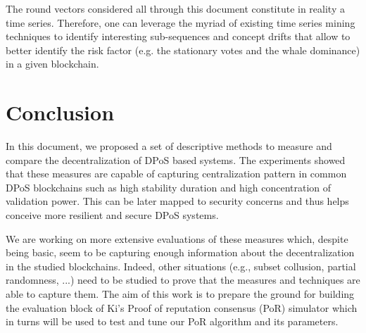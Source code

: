 \documentclass{article}
\begin{document}
The round vectors considered all through this document constitute in reality a time series. Therefore, one can leverage the myriad of existing time series mining techniques to identify interesting sub-sequences and concept drifts that allow to better identify the risk factor (e.g. the stationary votes and the whale dominance) in a given blockchain.
\section{Conclusion}
\label{sec:conclusion}
In this document, we proposed a set of descriptive methods to measure and compare the decentralization of DPoS based systems. The experiments showed that these measures are capable of capturing centralization pattern in common DPoS blockchains such as high stability duration and high concentration of validation power. This can be later mapped to security concerns and thus helps conceive more resilient and secure DPoS systems.

We are working on more extensive evaluations of these measures which, despite being basic, seem to be capturing enough information about the decentralization in the studied blockchains. Indeed, other situations (e.g., subset collusion, partial randomness, ...) need to be studied to prove that the measures and techniques are able to capture them. The aim of this work is to prepare the ground for building the evaluation block of Ki's Proof of reputation consensus (PoR) simulator which in turns will be used to test and tune our PoR algorithm and its parameters.



\end{document}
